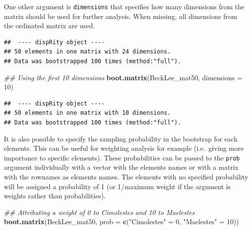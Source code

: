 \documentclass[]{book}
\newenvironment{Shaded}{\begin{snugshade}}{\end{snugshade}}
\newcommand{\CommentTok}[1]{\textcolor[rgb]{0.56,0.35,0.01}{\textit{#1}}}
\newcommand{\DataTypeTok}[1]{\textcolor[rgb]{0.13,0.29,0.53}{#1}}
\newcommand{\DecValTok}[1]{\textcolor[rgb]{0.00,0.00,0.81}{#1}}
\newcommand{\FloatTok}[1]{\textcolor[rgb]{0.00,0.00,0.81}{#1}}
\newcommand{\KeywordTok}[1]{\textcolor[rgb]{0.13,0.29,0.53}{\textbf{#1}}}
\newcommand{\NormalTok}[1]{#1}
\newcommand{\StringTok}[1]{\textcolor[rgb]{0.31,0.60,0.02}{#1}}
\begin{document}
One other argument is \texttt{dimensions} that specifies how many dimensions from the matrix should be used for further analysis.
When missing, all dimensions from the ordinated matrix are used.

\begin{Shaded}
\end{Shaded}

\begin{verbatim}
##  ---- dispRity object ---- 
## 50 elements in one matrix with 24 dimensions.
## Data was bootstrapped 100 times (method:"full").
\end{verbatim}

\begin{Shaded}
\begin{Highlighting}[]
\CommentTok{## Using the first 10 dimensions}
\KeywordTok{boot.matrix}\NormalTok{(BeckLee_mat50, }\DataTypeTok{dimensions =} \DecValTok{10}\NormalTok{)}
\end{Highlighting}
\end{Shaded}

\begin{verbatim}
##  ---- dispRity object ---- 
## 50 elements in one matrix with 10 dimensions.
## Data was bootstrapped 100 times (method:"full").
\end{verbatim}

It is also possible to specify the sampling probability in the bootstrap for each elements.
This can be useful for weighting analysis for example (i.e.~giving more importance to specific elements).
These probabilities can be passed to the \texttt{prob} argument individually with a vector with the elements names or with a matrix with the rownames as elements names.
The elements with no specified probability will be assigned a probability of 1 (or 1/maximum weight if the argument is weights rather than probabilities).

\begin{Shaded}
\begin{Highlighting}[]
\CommentTok{## Attributing a weight of 0 to Cimolestes and 10 to Maelestes}
\KeywordTok{boot.matrix}\NormalTok{(BeckLee_mat50,}
            \DataTypeTok{prob =} \KeywordTok{c}\NormalTok{(}\StringTok{"Cimolestes"}\NormalTok{ =}\StringTok{ }\DecValTok{0}\NormalTok{, }\StringTok{"Maelestes"}\NormalTok{ =}\StringTok{ }\DecValTok{10}\NormalTok{))}
\end{Highlighting}
\end{Shaded}
\end{document}

